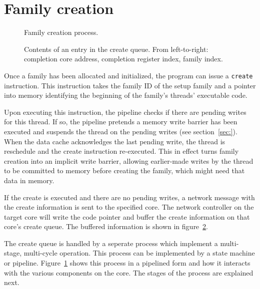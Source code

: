 \section{\label{sec:family-creation}Family creation}

\begin{figure}
 \begin{center}
  
  \caption{Family creation process.}
  \label{fig:family-creation}
 \end{center}
\end{figure}

\begin{figure}
 \begin{center}
  
  \caption{Contents of an entry in the create queue. From left-to-right: completion core address, completion register index, family index.}
  \label{fig:create-queue-contents}
 \end{center}
\end{figure}

Once a family has been allocated and initialized, the program can issue a {\tt create} instruction. This instruction takes the family ID of the setup family and a pointer into memory identifying the beginning of the family's threads' executable code.

Upon executing this instruction, the pipeline checks if there are pending writes for this thread. If so, the pipeline pretends a memory write barrier has been executed and suspends the thread on the pending writes (see section~\ref{sec:}). When the data cache acknowledges the last pending write, the thread is reschedule and the create instruction re-executed. This in effect turns family creation into an implicit write barrier, allowing earlier-made writes by the thread to be committed to memory before creating the family, which might need that data in memory.

If the create is executed and there are no pending writes, a network message with the create information is sent to the specified core. The network controller on the target core will write the code pointer and buffer the create information on that core's create queue. The buffered information is shown in figure~\ref{fig:create-queue-contents}.

The create queue is handled by a seperate process which implement a multi-stage, multi-cycle operation. This process can be implemented by a state machine or pipeline. Figure~\ref{fig:family-creation} shows this process in a pipelined form and how it interacts with the various components on the core. The stages of the process are explained next.

